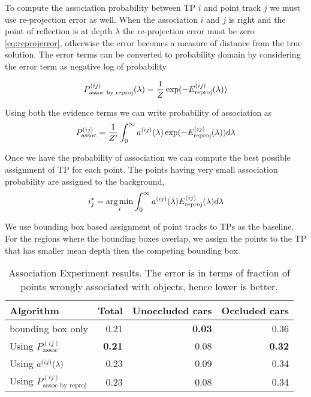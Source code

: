 To compute the association probability between TP $i$ and
point track $j$ we must use re-projection error as well. When the association
$i$ and $j$ is right and the point of reflection is at depth $\lambda$ the
re-projection error must be zero \eqref{eq:reprojerror}, otherwise the error
becomes a measure of distance from the true solution.
The error terms can be converted to probability domain by considering the error
term as negative log of probability

\begin{align}
  P^{(ij)}_{\text{assoc by reproj}}(\lambda) = \frac{1}{Z}\exp(-E^{(ij)}_{\text{reproj}}(\lambda))
\end{align}

Using both the evidence terms we can write probability of association as
\begin{align}
  P^{(ij)}_{\text{assoc}} = \frac{1}{Z'}\int_0^{\infty} a^{(ij)}(\lambda) \exp(-E^{(ij)}_{\text{reproj}}(\lambda))d\lambda
  \label{eq:prob-assoc}
\end{align}

Once we have the probability of association we can compute the best possible
assignment of TP for each point. The points having very small association
probability are assigned to the background,
\begin{align}
  i^*_{j} = \operatorname*{\arg\min}_{i} \int_0^\infty a^{(ij)}(\lambda) E^{(ij)}_{\text{reproj}}(\lambda) d\lambda
\end{align}

We use bounding box based assignment of point tracks to TPs as the baseline.
For the regions where the bounding boxes overlap, we assign the points to the
TP that has smaller mean depth then the competing bounding box.

\begin{table}
  \centering
  \begin{tabular}{lrrr}
    \toprule
    Algorithm & Total & Unoccluded cars & Occluded cars \\
    \midrule
    bounding box only & 0.21 & \textbf{0.03}  & 0.36\\
    Using $P^{(ij)}_{\text{assoc}}$ & \textbf{0.21} & 0.08 & \textbf{0.32}\\
    Using $a^{(ij)}(\lambda){}$ & 0.23 & 0.09 & 0.34 \\
    Using $P^{(ij)}_{\text{assoc by reproj}}$ & 0.23 & 0.08 & 0.34\\
    \bottomrule
  \end{tabular}
  \caption{Association Experiment results. The error is in terms of fraction of points wrongly associated with objects, hence lower is better.}
\end{table}


